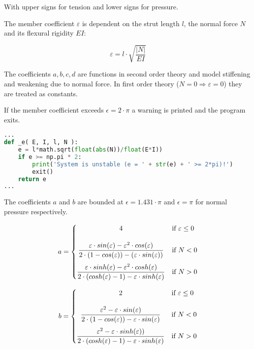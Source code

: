With upper signs for tension and lower signs for pressure.

The member coefficient $\varepsilon$ is dependent on the strut length $l$, the normal force $N$ and its flexural rigidity $EI$:

\begin{equation} \label{e}
\varepsilon = l \cdot \sqrt{\frac{|N|}{EI}}
\end{equation}

The coefficients $a, b, c ,d$ are functions in second order theory and model stiffening and weakening due to normal force.
In first order theory ($N = 0 \Rightarrow \varepsilon = 0$) they are treated as constants.

If the member coefficient exceeds $\epsilon = 2 \cdot \pi$ a warning is printed and the program exits.

\begin{inconsolata}
\begin{minipage}{\linewidth}
\begin{lstlisting}[language=python]
...
def _e( E, I, l, N ):
    e = l*math.sqrt(float(abs(N))/float(E*I))
    if e >= np.pi * 2:
        print('System is unstable (e = ' + str(e) + ' >= 2*pi)!')
        exit()
    return e
...
\end{lstlisting}
\end{minipage}
\end{inconsolata}

The coefficients $a$ and $b$ are bounded at $\epsilon = 1.431 \cdot \pi$ and $\epsilon = \pi$ for normal pressure respectively.

\pagebreak

\begin{equation} \label{a}
    a = \begin{cases}
            \hfil 4              & \text{if } \varepsilon \leq 0\\[1.2em]
            \hfil \dfrac{\varepsilon \cdot sin(\varepsilon) - \varepsilon^2 \cdot cos(\varepsilon)}{2 \cdot (1 - cos(\varepsilon)) - (\varepsilon \cdot sin(\varepsilon))}               & \text{if } N < 0          \\[1.2em]
            \dfrac{\varepsilon \cdot sinh(\varepsilon) - \varepsilon^2 \cdot cosh(\varepsilon)}{2 \cdot (cosh(\varepsilon) - 1) - \varepsilon \cdot sinh(\varepsilon)}               & \text{if } N > 0
        \end{cases}
\end{equation}

\begin{equation} \label{b}
    b = \begin{cases}
            \hfil 2              & \text{if } \varepsilon \leq 0\\[1.2em]
            \hfil \dfrac{\varepsilon^2 - \varepsilon \cdot sin(\varepsilon)}{2\cdot(1 - cos(\varepsilon)) - \varepsilon \cdot sin(\varepsilon) }               & \text{if } N < 0          \\[1.2em]
            \dfrac{\varepsilon^2 - \varepsilon \cdot sinh(\varepsilon))}{2 \cdot (cosh(\varepsilon) - 1) - \varepsilon \cdot sinh(\varepsilon)}               & \text{if } N > 0
        \end{cases}
\end{equation}

